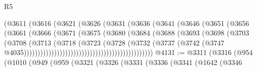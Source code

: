 \begin{lexlean}{R5}
\begin{coremodule}
                                        (@3611
                                          (@3616
                                            (@3621
                                              (@3626
                                                (@3631
                                                  (@3636
                                                    (@3641
                                                      (@3646
                                                        (@3651
                                                          (@3656
                                                            (@3661
                                                              (@3666
                                                                (@3671
                                                                  (@3675
                                                                    (@3680
                                                                      (@3684
                                                                        (@3688
                                                                          (@3693
                                                                            (@3698
                                                                              (@3703
                                                                                (@3708
                                                                                  (@3713
                                                                                    (@3718
                                                                                      (@3723
                                                                                        (@3728
                                                                                          (@3732
                                                                                            (@3737
                                                                                              (@3742
                                                                                                (@3747
                                                                                                  @4035)))))))))))))))))))))))))))))))))))))))))))))))
@4131 := @3311
    (@3316
      (@954
        (@1010
          (@949
            (@959
              (@3321
                (@3326
                  (@3331
                    (@3336
                      (@3341
                        (@1642
                          (@3346

\end{coremodule}
\end{lexlean}
